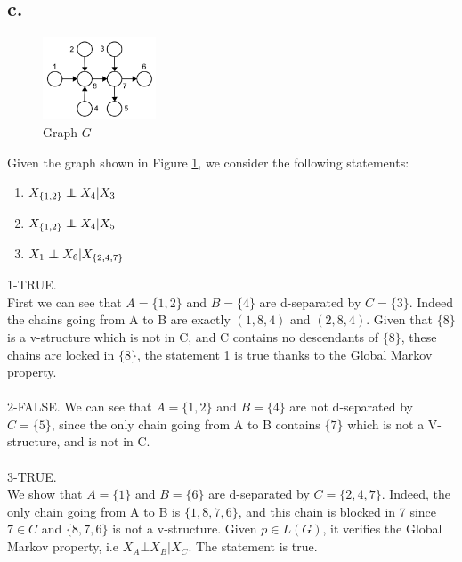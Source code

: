 \documentclass[12pt]{article}
\newcommand\independent{\protect\mathpalette{\protect\independenT}{\perp}}
\def\independenT#1#2{\mathrel{\rlap{$#1#2$}\mkern2mu{#1#2}}}
\begin{document}
\subsection*{c.}
\begin{figure}
	\vspace{-20pt}
	\begin{center}
		\includegraphics[width=0.3\textwidth]{./pics/ex2c.png}
	\end{center}
	\vspace{-20pt}
	\caption{Graph $G$}
	\label{fig:ex2c}
\end{figure}
Given the graph shown in Figure \ref{fig:ex2c}, we consider the following statements:
\begin{enumerate}
	\item $X_{\{1,2\}}\independent X_4|X_3$
	\item $X_{\{1,2\}}\independent X_4|X_5$
	\item $X_1\independent X_6|X_{\{2,4,7\}}$
\end{enumerate}
1-TRUE.~\\
First we can see that $A=\{1,2\}$ and $B=\{4\}$ are d-separated by $C=\{3\}$. Indeed the chains going from A to B are exactly $(1,8,4)$ and $(2,8,4)$. Given that $\{8\}$ is a v-structure which is not in C, and C contains no descendants of $\{8\}$, these chains are locked in $\{8\}$, the statement 1 is true thanks to the Global Markov property.~\\
~\\
2-FALSE.
We can see that $A=\{1,2\}$ and $B=\{4\}$ are not d-separated by $C=\{5\}$, since the only chain going from A to B contains $\{7\}$ which is not a V-structure, and is not in C.~\\
~\\
3-TRUE.~\\
We show that $A=\{1\}$ and $B=\{6\}$ are d-separated by $C=\{2,4,7\}$. Indeed, the only chain going from A to B is $\{1,8,7,6\}$, and this chain is blocked in 7 since $7\in C$ and $\{8, 7, 6\}$ is not a v-structure. Given $p\in L(G)$, it verifies the Global Markov property, i.e $X_{A} \bot X_{B} | X_{C}$. The statement is true.~\\
\end{document}
